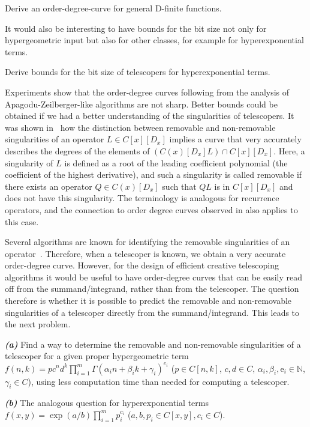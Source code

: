 \documentclass{jssc}
\let\set\mathbb
\def\e{\mathrm{e}}
\begin{document}
 \begin{problem}
   Derive an order-degree-curve for general D-finite functions.
 \end{problem}

 It would also be interesting to have bounds for the bit size not only for hypergeometric input but also for
 other classes, for example for hyperexponential terms.

 \begin{problem}
   Derive bounds for the bit size of telescopers for hyperexponential terms.
 \end{problem}

 Experiments show that the order-degree curves following from the analysis of Apagodu-Zeilberger-like algorithms
 are not sharp. Better bounds could be obtained if we had a better understanding of the singularities of
 telescopers. It was shown in~\cite{jaroschek13a} how the distinction between removable and non-removable singularities of
 an operator $L\in C[x][D_x]$ implies a curve that very accurately describes the degrees of the elements of
 $(C(x)[D_x]L)\cap C[x][D_x]$. Here, a singularity of $L$ is defined as a root of the leading coefficient
 polynomial (the coefficient of the highest derivative), and such a singularity is called removable if there
 exists an operator $Q\in C(x)[D_x]$ such that $QL$ is in $C[x][D_x]$ and does not have this singularity.
 The terminology is analogous for recurrence operators, and the connection to order degree curves observed
 in \cite{jaroschek13a} also applies to this case.

 Several algorithms are known for identifying the removable singularities of an operator~\cite{abramov99b,abramov06a,chen15b}.
 Therefore, when a telescoper is known, we obtain a very accurate order-degree curve.
 However, for the design of efficient creative telescoping algorithms it would be useful to have order-degree
 curves that can be easily read off from the summand/integrand, rather than from the telescoper.
 The question therefore is whether it is possible to predict the removable and non-removable singularities
 of a telescoper directly from the summand/integrand. This leads to the next problem.

 \begin{problem} \textbf{\emph{(a)}}
   Find a way to determine the removable and non-removable singularities of a telescoper for a given proper
   hypergeometric term $f(n,k)=p c^n d^k \prod_{i=1}^m \Gamma(\alpha_i n+\beta_i k+\gamma_i)^{e_i}$
   ($p\in C[n,k]$, $c,d\in C$, $\alpha_i,\beta_i,\e_i\in\set N$, $\gamma_i\in C$),
   using less computation time than needed for computing a telescoper.

   \textbf{\emph{(b)}} The analogous question for hyperexponential terms $f(x,y){=}\exp(a/b)\prod_{i=1}^m p_i^{c_i}$
   ($a,b,p_i\in C[x,y],c_i\in C$).
 \end{problem}
\end{document}
